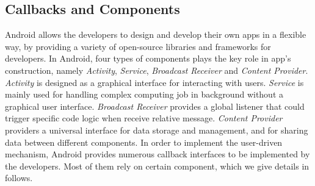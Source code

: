 \subsection{Callbacks and Components}
Android allows the developers to design and develop their own apps in a flexible way, 
by providing a variety of open-source libraries and frameworks for developers. 
In Android, four types of components plays the key role in app's construction, namely \textit{Activity}, \textit{Service}, \textit{Broadcast Receiver} and \textit{Content Provider}. 
\textit{Activity} is designed as a graphical interface for interacting with users. 
\textit{Service} is mainly used for handling complex computing job in background without a graphical user interface. 
\textit{Broadcast Receiver} provides a global listener that could trigger specific code logic when receive relative message. 
\textit{Content Provider} providers a universal interface for data storage and management, and for sharing data between different components. 
In order to implement the user-driven mechanism, Android provides numerous callback interfaces to be implemented by the developers. 
Most of them rely on certain component, which we give details in follows.

